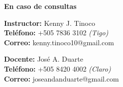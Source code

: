 \vspace*{\fill}
\begin{flushright}
    \textbf{\large En caso de consultas}

    \textbf{Instructor:} Kenny J. Tinoco \\
    \textbf{Teléfono:} +505 7836 3102 \emph{(Tigo)} \\
    \textbf{Correo:} kenny.tinoco10@gmail.com

    \textbf{Docente:} José A. Duarte\\
    \textbf{Teléfono:} +505 8420 4002 \emph{(Claro)}\\
    \textbf{Correo:} joseandanduarte@gmail.com

\end{flushright}
\vspace*{0cm}